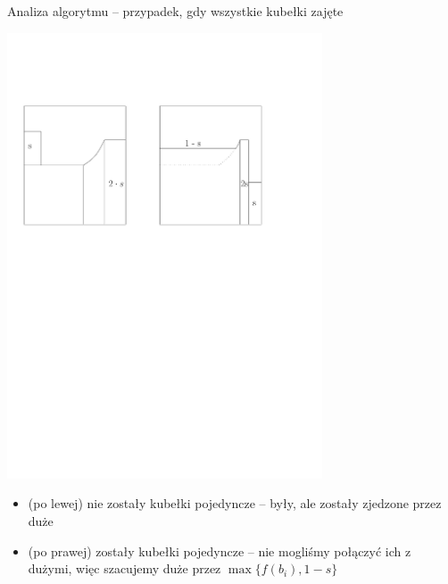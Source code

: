 \documentclass{beamer}
\begin{document}
\begin{frame}{Analiza algorytmu -- przypadek, gdy wszystkie kubełki zajęte}
  \begin{center}
    \includegraphics[width=0.7\textwidth]{figs/G1G2.pdf}
  \end{center}

    \begin{itemize}
      \item (po lewej) nie zostały kubełki pojedyncze -- były, ale zostały zjedzone przez duże
      \item (po prawej) zostały kubełki pojedyncze -- nie mogliśmy połączyć ich z dużymi, więc szacujemy duże przez $\max\{ f(b_i), 1 - s \}$
      \end{itemize}
\end{frame}
\end{document}
